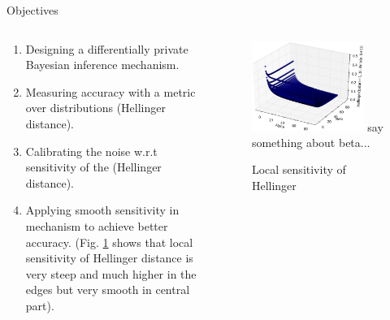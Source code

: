\documentclass[final,hyperref={pdfpagelabels=false}]{beamer}
\begin{document}
\begin{frame}[t]
\begin{columns}[t]
\begin{column}{.485\textwidth}
\begin{block}{Objectives}
\begin{columns} %
\begin{column}{.69\textwidth}
\begin{enumerate}
\item Designing a differentially private Bayesian inference mechanism.
\item Measuring accuracy with a metric over distributions (Hellinger distance).
\item Calibrating the noise w.r.t sensitivity of the (Hellinger distance).
\item Applying smooth sensitivity in mechanism to achieve better accuracy.
        (Fig. \ref{fig_sensitivity} shows that local sensitivity of Hellinger distance is very steep and much higher in the edges but very smooth in central part).
\end{enumerate}
\end{column}
\begin{column}{.28\textwidth}
\begin{figure}[ht]
\centering
\includegraphics[width=0.85\textwidth]{poster_0.eps}
say something about beta...
\caption{\footnotesize{Local sensitivity of Hellinger}}
\label{fig_sensitivity}
\end{figure}
\end{column}
\end{columns}



\end{block}
\end{column}
\end{columns}
\end{frame}
\end{document}
